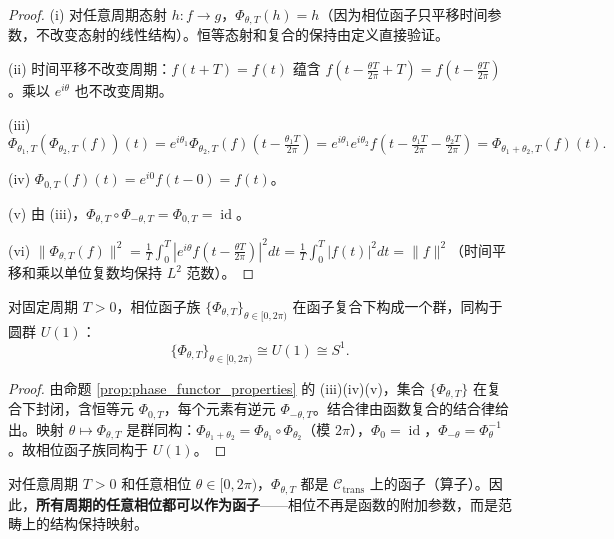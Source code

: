 \begin{proof}
(i) 对任意周期态射 $h: f \to g$，$\Phi_{\theta, T}(h) = h$（因为相位函子只平移时间参数，不改变态射的线性结构）。恒等态射和复合的保持由定义直接验证。

(ii) 时间平移不改变周期：$f(t + T) = f(t)$ 蕴含 $f(t - \frac{\theta T}{2\pi} + T) = f(t - \frac{\theta T}{2\pi})$。乘以 $e^{i\theta}$ 也不改变周期。

(iii)
\[
\Phi_{\theta_1, T}(\Phi_{\theta_2, T}(f))(t) = e^{i\theta_1} \Phi_{\theta_2, T}(f)\!\left( t - \tfrac{\theta_1 T}{2\pi} \right) = e^{i\theta_1} e^{i\theta_2} f\!\left( t - \tfrac{\theta_1 T}{2\pi} - \tfrac{\theta_2 T}{2\pi} \right) = \Phi_{\theta_1 + \theta_2, T}(f)(t).
\]

(iv) $\Phi_{0, T}(f)(t) = e^{i0} f(t - 0) = f(t)$。

(v) 由 (iii)，$\Phi_{\theta, T} \circ \Phi_{-\theta, T} = \Phi_{0, T} = \operatorname{id}$。

(vi) $\|\Phi_{\theta, T}(f)\|^2 = \frac{1}{T}\int_0^T |e^{i\theta} f(t - \frac{\theta T}{2\pi})|^2 dt = \frac{1}{T}\int_0^T |f(t)|^2 dt = \|f\|^2$（时间平移和乘以单位复数均保持 $L^2$ 范数）。
\end{proof}

\begin{theorem}[相位函子族的群结构]\label{thm:phase_functor_group}
对固定周期 $T > 0$，相位函子族 $\{\Phi_{\theta, T}\}_{\theta \in [0, 2\pi)}$ 在函子复合下构成一个群，同构于圆群 $U(1)$：
\[
\{\Phi_{\theta, T}\}_{\theta \in [0, 2\pi)} \cong U(1) \cong S^1.
\]
\end{theorem}

\begin{proof}
由命题 \ref{prop:phase_functor_properties} 的 (iii)(iv)(v)，集合 $\{\Phi_{\theta, T}\}$ 在复合下封闭，含恒等元 $\Phi_{0, T}$，每个元素有逆元 $\Phi_{-\theta, T}$。结合律由函数复合的结合律给出。映射 $\theta \mapsto \Phi_{\theta, T}$ 是群同构：$\Phi_{\theta_1 + \theta_2} = \Phi_{\theta_1} \circ \Phi_{\theta_2}$（模 $2\pi$），$\Phi_0 = \operatorname{id}$，$\Phi_{-\theta} = \Phi_\theta^{-1}$。故相位函子族同构于 $U(1)$。
\end{proof}

\begin{corollary}[所有相位的函子性]\label{cor:all_phases_functorial}
对任意周期 $T > 0$ 和任意相位 $\theta \in [0, 2\pi)$，$\Phi_{\theta, T}$ 都是 $\mathcal{C}_{\text{trans}}$ 上的函子（算子）。因此，\textbf{所有周期的任意相位都可以作为函子}——相位不再是函数的附加参数，而是范畴上的结构保持映射。
\end{corollary}

